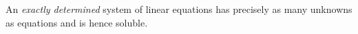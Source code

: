 \documentclass{article}
\begin{document}
An \emph{exactly determined} system of linear equations has precisely as many unknowns as equations and is hence soluble.
\end{document}
